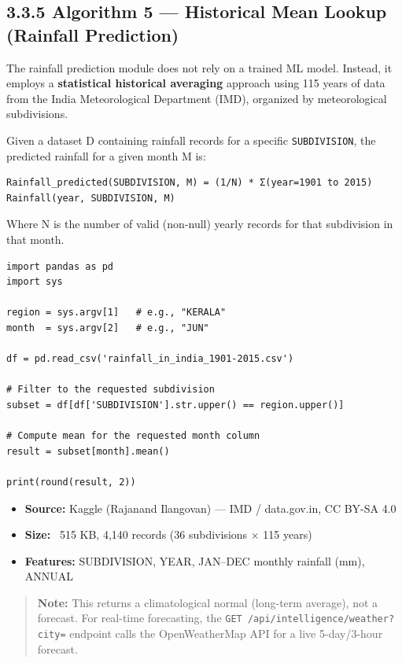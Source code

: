 \documentclass[12pt,a4paper]{report}
\begin{document}
\subsection{3.3.5 Algorithm 5 — Historical Mean Lookup (Rainfall Prediction)}


The rainfall prediction module does not rely on a trained ML model. Instead, it employs a \textbf{statistical historical averaging} approach using 115 years of data from the India Meteorological Department (IMD), organized by meteorological subdivisions.


Given a dataset D containing rainfall records for a specific \texttt{SUBDIVISION}, the predicted rainfall for a given month M is:

\begin{verbatim}
Rainfall_predicted(SUBDIVISION, M) = (1/N) * Σ(year=1901 to 2015) Rainfall(year, SUBDIVISION, M)
\end{verbatim}

Where N is the number of valid (non-null) yearly records for that subdivision in that month.


\begin{verbatim}
import pandas as pd
import sys

region = sys.argv[1]   # e.g., "KERALA"
month  = sys.argv[2]   # e.g., "JUN"

df = pd.read_csv('rainfall_in_india_1901-2015.csv')

# Filter to the requested subdivision
subset = df[df['SUBDIVISION'].str.upper() == region.upper()]

# Compute mean for the requested month column
result = subset[month].mean()

print(round(result, 2))
\end{verbatim}


\begin{itemize}
\item \textbf{Source:} Kaggle (Rajanand Ilangovan) — IMD / data.gov.in, CC BY-SA 4.0
\item \textbf{Size:} ~515 KB, 4,140 records (36 subdivisions × 115 years)
\item \textbf{Features:} SUBDIVISION, YEAR, JAN–DEC monthly rainfall (mm), ANNUAL
\end{itemize}
\begin{quote}
\textbf{Note:} This returns a climatological normal (long-term average), not a forecast. For real-time forecasting, the \texttt{GET /api/intelligence/weather?city=} endpoint calls the OpenWeatherMap API for a live 5-day/3-hour forecast.
\end{quote}
\end{document}
